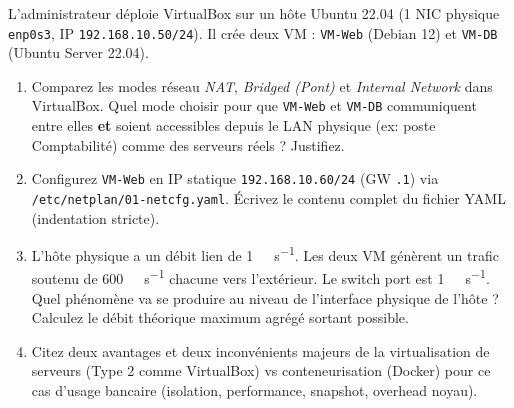 \documentclass[11pt]{article}
\begin{document}
\begin{exercice}
L'administrateur déploie VirtualBox sur un hôte Ubuntu 22.04 (1 NIC physique \texttt{enp0s3}, IP \texttt{192.168.10.50/24}). Il crée deux VM : \texttt{VM-Web} (Debian 12) et \texttt{VM-DB} (Ubuntu Server 22.04).
\begin{enumerate}
    \item Comparez les modes réseau \textit{NAT}, \textit{Bridged (Pont)} et \textit{Internal Network} dans VirtualBox. Quel mode choisir pour que \texttt{VM-Web} et \texttt{VM-DB} communiquent entre elles \textbf{et} soient accessibles depuis le LAN physique (ex: poste Comptabilité) comme des serveurs réels ? Justifiez.
    \item Configurez \texttt{VM-Web} en IP statique \texttt{192.168.10.60/24} (GW \texttt{.1}) via \texttt{/etc/netplan/01-netcfg.yaml}. Écrivez le contenu complet du fichier YAML (indentation stricte).
    \item L'hôte physique a un débit lien de \SI{1}{\giga\bit\per\second}. Les deux VM génèrent un trafic soutenu de \SI{600}{\mega\bit\per\second} chacune vers l'extérieur. Le switch port est \SI{1}{\giga\bit\per\second}. Quel phénomène va se produire au niveau de l'interface physique de l'hôte ? Calculez le débit théorique maximum agrégé sortant possible.
    \item Citez deux avantages et deux inconvénients majeurs de la virtualisation de serveurs (Type 2 comme VirtualBox) vs conteneurisation (Docker) pour ce cas d'usage bancaire (isolation, performance, snapshot, overhead noyau).
\end{enumerate}
\end{exercice}
\end{document}

